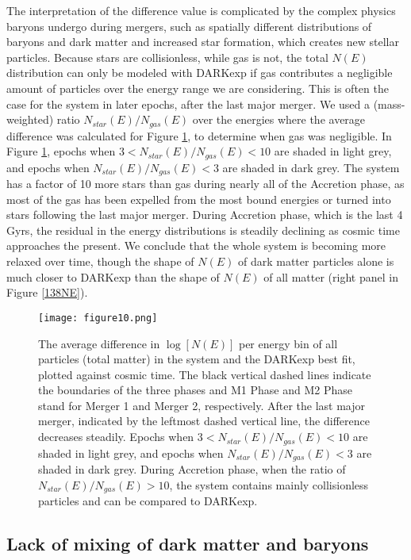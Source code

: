 \documentclass[a4paper,11pt]{article}
\begin{document}
The interpretation of the difference value is complicated by the complex physics baryons undergo during mergers, such as spatially different distributions of baryons 
and dark matter and increased star formation, which creates new stellar particles.  Because stars are collisionless, while gas is not, the total $N(E)$ distribution can only be modeled with DARKexp if gas 
contributes a negligible amount of particles over the energy range we are considering.  This is often the case for the system in later epochs, after the last 
major merger.  We used a (mass-weighted) ratio $N_{star}(E)/N_{gas}(E)$ over the energies where the average difference was calculated for Figure 
\ref{allmatterave_diff}, to determine when gas was negligible.  
In Figure \ref{allmatterave_diff}, epochs when $3<N_{star}(E)/N_{gas}(E)<10$ are shaded in light grey, and epochs when $N_{star}(E)/N_{gas}(E)<3$ are shaded in dark 
grey.  The system has a factor of 10 more stars than gas during nearly all of the Accretion phase, as most of the gas has been expelled from the most bound 
energies or turned into stars following the last major merger.  During Accretion phase, which is the last 4 Gyrs, the residual in the energy distributions is 
steadily declining as cosmic time approaches the present.  We conclude that the whole system is becoming more relaxed over time, though the shape of $N(E)$ of 
dark matter particles alone is much closer to DARKexp than the shape of $N(E)$ of all matter (right panel in Figure \ref{138NE}).  

\begin{figure}
\centering
\texttt{[image: figure10.png]}
\caption{The average difference in $\log[N(E)]$ per energy bin of all particles (total matter) in the system and the DARKexp best fit, plotted against cosmic 
time.  The black vertical dashed lines indicate the boundaries of the three phases and M1 Phase and M2 Phase stand for Merger 1 and Merger 2, 
respectively.  After the last major merger, indicated by the leftmost 
dashed vertical line, the difference decreases steadily.  Epochs when $3<N_{star}(E)/N_{gas}(E)<10$ are shaded in light grey, and epochs when 
$N_{star}(E)/N_{gas}(E)<3$ are shaded in dark grey.  During Accretion phase, when the ratio of $N_{star}(E)/N_{gas}(E)>10$, the system contains mainly collisionless 
particles and can be compared to DARKexp.}
\label{allmatterave_diff}
\end{figure}


\subsection{Lack of mixing of dark matter and baryons}
\end{document}
